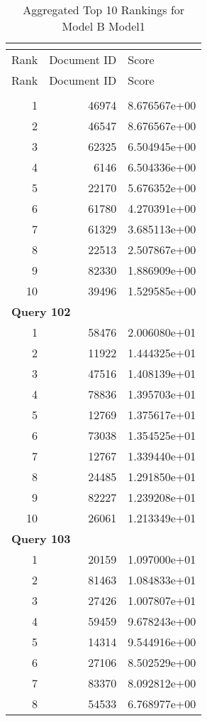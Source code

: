 \begin{longtable}[{p}]{@{}rrp{}@{}}
\caption{Aggregated Top 10 Rankings for Model B Model1} {\label{tab:aggregated_BModel1}}\\
\toprule
Rank & Document ID & Score \\
\midrule
\endfirsthead
\toprule
Rank & Document ID & Score \\
\midrule
\endhead
\endfoot
\bottomrule
\endlastfoot
\multicolumn{3}{l}{\bfseries Query 101} \\
1 & 46974 & 8.676567e+00 \\
2 & 46547 & 8.676567e+00 \\
3 & 62325 & 6.504945e+00 \\
4 & 6146 & 6.504336e+00 \\
5 & 22170 & 5.676352e+00 \\
6 & 61780 & 4.270391e+00 \\
7 & 61329 & 3.685113e+00 \\
8 & 22513 & 2.507867e+00 \\
9 & 82330 & 1.886909e+00 \\
10 & 39496 & 1.529585e+00 \\
\midrule
\multicolumn{3}{l}{\bfseries Query 102} \\
1 & 58476 & 2.006080e+01 \\
2 & 11922 & 1.444325e+01 \\
3 & 47516 & 1.408139e+01 \\
4 & 78836 & 1.395703e+01 \\
5 & 12769 & 1.375617e+01 \\
6 & 73038 & 1.354525e+01 \\
7 & 12767 & 1.339440e+01 \\
8 & 24485 & 1.291850e+01 \\
9 & 82227 & 1.239208e+01 \\
10 & 26061 & 1.213349e+01 \\
\midrule
\multicolumn{3}{l}{\bfseries Query 103} \\
1 & 20159 & 1.097000e+01 \\
2 & 81463 & 1.084833e+01 \\
3 & 27426 & 1.007807e+01 \\
4 & 59459 & 9.678243e+00 \\
5 & 14314 & 9.544916e+00 \\
6 & 27106 & 8.502529e+00 \\
7 & 83370 & 8.092812e+00 \\
8 & 54533 & 6.768977e+00 \\

\end{longtable}
